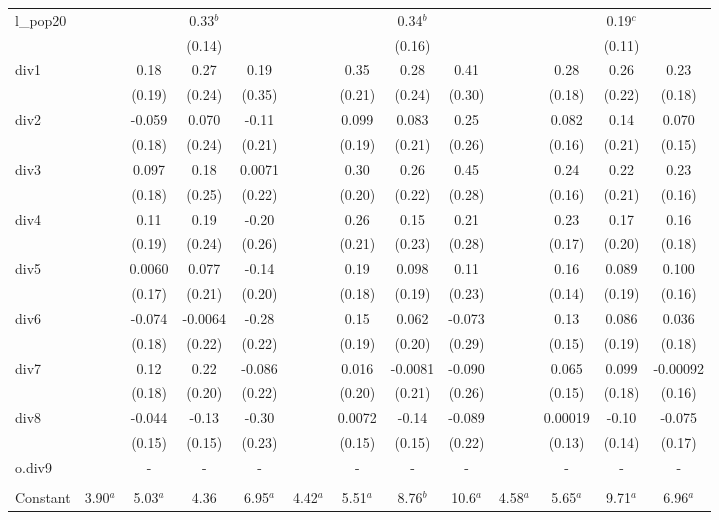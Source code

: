 \documentclass[]{article}
\begin{document}
\begin{tabular}{lcccccccccccc}
l\_pop20 &  &  & 0.33$^b$ &  &  &  & 0.34$^b$ &  &  &  & 0.19$^c$ &  \\
 &  &  & (0.14) &  &  &  & (0.16) &  &  &  & (0.11) &  \\
div1 &  & 0.18 & 0.27 & 0.19 &  & 0.35 & 0.28 & 0.41 &  & 0.28 & 0.26 & 0.23 \\
 &  & (0.19) & (0.24) & (0.35) &  & (0.21) & (0.24) & (0.30) &  & (0.18) & (0.22) & (0.18) \\
div2 &  & -0.059 & 0.070 & -0.11 &  & 0.099 & 0.083 & 0.25 &  & 0.082 & 0.14 & 0.070 \\
 &  & (0.18) & (0.24) & (0.21) &  & (0.19) & (0.21) & (0.26) &  & (0.16) & (0.21) & (0.15) \\
div3 &  & 0.097 & 0.18 & 0.0071 &  & 0.30 & 0.26 & 0.45 &  & 0.24 & 0.22 & 0.23 \\
 &  & (0.18) & (0.25) & (0.22) &  & (0.20) & (0.22) & (0.28) &  & (0.16) & (0.21) & (0.16) \\
div4 &  & 0.11 & 0.19 & -0.20 &  & 0.26 & 0.15 & 0.21 &  & 0.23 & 0.17 & 0.16 \\
 &  & (0.19) & (0.24) & (0.26) &  & (0.21) & (0.23) & (0.28) &  & (0.17) & (0.20) & (0.18) \\
div5 &  & 0.0060 & 0.077 & -0.14 &  & 0.19 & 0.098 & 0.11 &  & 0.16 & 0.089 & 0.100 \\
 &  & (0.17) & (0.21) & (0.20) &  & (0.18) & (0.19) & (0.23) &  & (0.14) & (0.19) & (0.16) \\
div6 &  & -0.074 & -0.0064 & -0.28 &  & 0.15 & 0.062 & -0.073 &  & 0.13 & 0.086 & 0.036 \\
 &  & (0.18) & (0.22) & (0.22) &  & (0.19) & (0.20) & (0.29) &  & (0.15) & (0.19) & (0.18) \\
div7 &  & 0.12 & 0.22 & -0.086 &  & 0.016 & -0.0081 & -0.090 &  & 0.065 & 0.099 & -0.00092 \\
 &  & (0.18) & (0.20) & (0.22) &  & (0.20) & (0.21) & (0.26) &  & (0.15) & (0.18) & (0.16) \\
div8 &  & -0.044 & -0.13 & -0.30 &  & 0.0072 & -0.14 & -0.089 &  & 0.00019 & -0.10 & -0.075 \\
 &  & (0.15) & (0.15) & (0.23) &  & (0.15) & (0.15) & (0.22) &  & (0.13) & (0.14) & (0.17) \\
o.div9 &  & - & - & - &  & - & - & - &  & - & - & - \\
 &  &  &  &  &  &  &  &  &  &  &  &  \\
Constant & 3.90$^a$ & 5.03$^a$ & 4.36 & 6.95$^a$ & 4.42$^a$ & 5.51$^a$ & 8.76$^b$ & 10.6$^a$ & 4.58$^a$ & 5.65$^a$ & 9.71$^a$ & 6.96$^a$ \\

\end{tabular}
\end{document}
